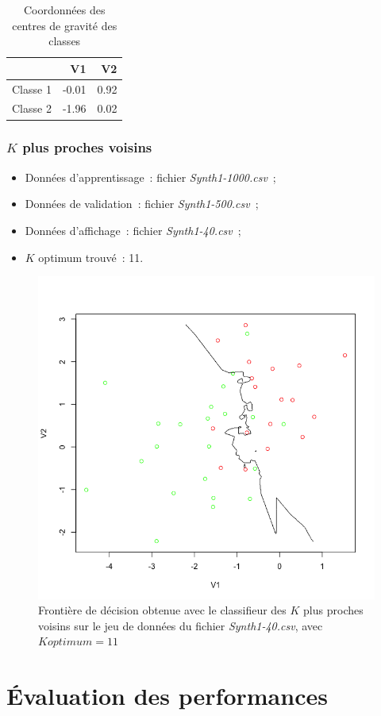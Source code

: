 \documentclass[a4paper,10pt]{report}
\begin{document}
\begin{table}[H]
	\centering
	\begin{tabular}{r|rr}
		& V1 & V2 \\ 
		\hline
		\small Classe 1 & -0.01 & 0.92 \\ 
		\small Classe 2 & -1.96 & 0.02 \\ 
	\end{tabular}
	\caption{\small Coordonnées des centres de gravité des classes}
	\label{table:1-1-3-mu-class-euc}
\end{table}


\subsubsection{$K$ plus proches voisins}

\begin{itemize}
	\item Données d'apprentissage~: fichier \textit{Synth1-1000.csv}~;
	\item Données de validation~: fichier \textit{Synth1-500.csv}~;
	\item Données d'affichage~: fichier \textit{Synth1-40.csv}~;
	\item $K$ optimum trouvé~: 11.
\end{itemize}

\begin{figure}[H]
	\centering
	\captionsetup{justification=centering, margin=4cm}
	\includegraphics[width=.5\linewidth]{img/1-1-3-front-kppv}
	\caption{\small Frontière de décision obtenue avec le classifieur des $K$ plus proches voisins sur le jeu de données du fichier \textit{Synth1-40.csv}, avec $K optimum = 11$}
	\label{fig:1-1-3-front-kppv}%
\end{figure}






\section{Évaluation des performances}
\end{document}

